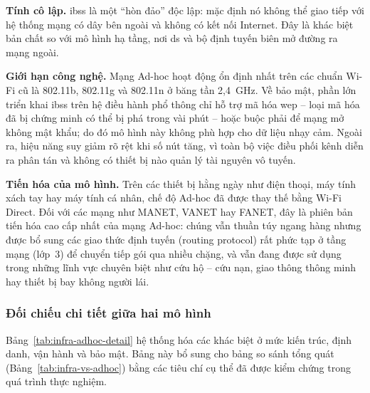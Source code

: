 \textbf{Tính cô lập.} \ac{ibss} là một ``hòn đảo'' độc lập: mặc định nó không
thể giao tiếp với hệ thống mạng có dây bên ngoài và không có kết nối Internet.
Đây là khác biệt bản chất so với mô hình hạ tầng, nơi \ac{ds} và bộ định tuyến
biên mở đường ra mạng ngoài.

\textbf{Giới hạn công nghệ.} Mạng Ad-hoc hoạt động ổn định nhất trên các chuẩn
Wi-Fi cũ là 802.11b, 802.11g và 802.11n ở băng tần 2,4~GHz. Về bảo mật, phần
lớn triển khai \ac{ibss} trên hệ điều hành phổ thông chỉ hỗ trợ mã hóa
\ac{wep} -- loại mã hóa đã bị chứng minh có thể bị phá trong vài phút -- hoặc
buộc phải để mạng mở không mật khẩu; do đó mô hình này không phù hợp cho dữ liệu
nhạy cảm. Ngoài ra, hiệu năng suy giảm rõ rệt khi số nút tăng, vì toàn bộ việc
điều phối kênh diễn ra phân tán và không có thiết bị nào quản lý tài nguyên vô
tuyến.

\textbf{Tiến hóa của mô hình.} Trên các thiết bị hằng ngày như điện thoại, máy
tính xách tay hay máy tính cá nhân, chế độ Ad-hoc đã được thay thế bằng
Wi-Fi Direct. Đối với các mạng như MANET, VANET hay FANET, đây là phiên bản
tiến hóa cao cấp nhất của mạng Ad-hoc: chúng vẫn thuần túy ngang hàng nhưng được
bổ sung các giao thức định tuyến (routing protocol) rất phức tạp ở tầng mạng
(lớp~3) để chuyển tiếp gói qua nhiều chặng, và vẫn đang được sử dụng trong những
lĩnh vực chuyên biệt như cứu hộ -- cứu nạn, giao thông thông minh hay thiết bị
bay không người lái.

\subsubsection{Đối chiếu chi tiết giữa hai mô hình}

Bảng~\ref{tab:infra-adhoc-detail} hệ thống hóa các khác biệt ở mức kiến trúc,
định danh, vận hành và bảo mật. Bảng này bổ sung cho bảng so sánh tổng quát
(Bảng~\ref{tab:infra-vs-adhoc}) bằng các tiêu chí cụ thể đã được kiểm chứng
trong quá trình thực nghiệm.

